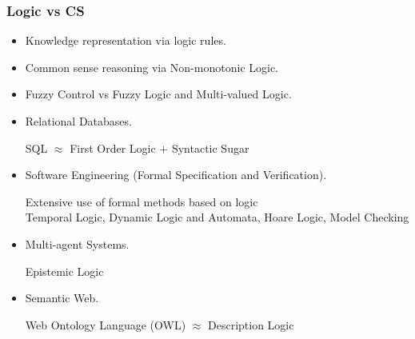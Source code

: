 \documentclass[UTF8,11pt,colorlinks,compress,openany]{beamer}%
\begin{document}
\begin{frame}\frametitle{Logic vs CS}
	\begin{itemize}
		\item Knowledge representation via logic rules.
		\item Common sense reasoning via Non-monotonic Logic.
		\item Fuzzy Control vs Fuzzy Logic and Multi-valued Logic.
		\item Relational Databases.
		
		SQL $\approx$ First Order Logic $+$ Syntactic Sugar
		\item Software Engineering (Formal Specification and Verification).
		
		Extensive use of formal methods based on logic\\
		Temporal Logic, Dynamic Logic and Automata, Hoare Logic, Model Checking
		\item Multi-agent Systems.
		
		Epistemic Logic
		\item Semantic Web.
		
		Web Ontology Language (OWL) $\approx$ Description Logic
	\end{itemize}
\end{frame}
\end{document}
